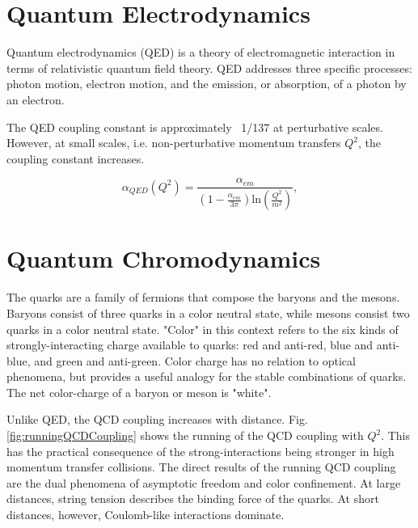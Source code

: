 \section{Quantum Electrodynamics}

Quantum electrodynamics (QED) is a theory of electromagnetic interaction in terms of relativistic quantum field theory. QED addresses three specific processes: photon motion, electron motion, and the emission, or absorption, of a photon by an electron.

The QED coupling constant is approximately ~1/137 at perturbative scales. However, at small scales, i.e. non-perturbative momentum transfers $Q^2$, the coupling constant increases.

\begin{equation}
\alpha_{QED}(Q^2) = \frac{ \alpha_{em}}{(1 - \frac{\alpha_{em}}{3\pi})\mathrm{ln}(\frac{Q^2}{m^2}) } ,
\end{equation}

\section{Quantum Chromodynamics}

The quarks are a family of fermions that compose the baryons and the mesons. Baryons consist of three quarks in a color neutral state, while mesons consist two quarks in a color neutral state. "Color" in this context refers to the six kinds of strongly-interacting charge available to quarks: red and anti-red, blue and anti-blue, and green and anti-green. Color charge has no relation to optical phenomena, but provides a useful analogy for the stable combinations of quarks. The net color-charge of a baryon or meson is "white".

Unlike QED, the QCD coupling increases with distance. Fig.\ref{fig:runningQCDCoupling} shows the running of the QCD coupling with $Q^2$. This has the practical consequence of the strong-interactions being stronger in high momentum transfer collisions. The direct results of the running QCD coupling are the dual phenomena of asymptotic freedom and color confinement. At large distances, string tension describes the binding force of the quarks. At short distances, however, Coulomb-like interactions dominate.

